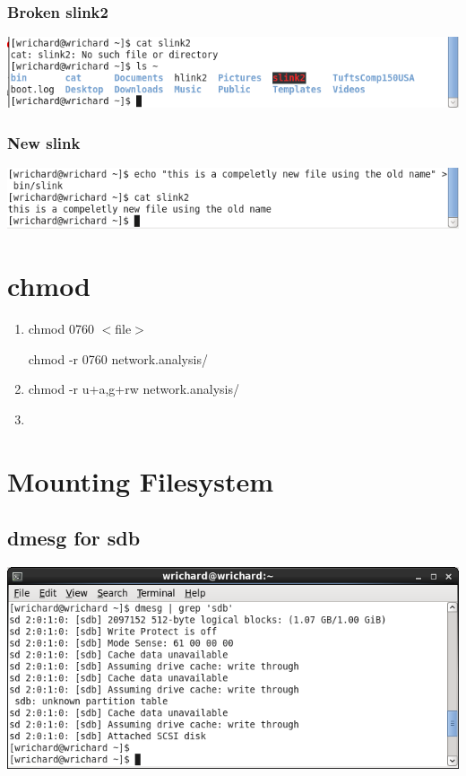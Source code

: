 \documentclass[a4paper,10pt]{article}
\begin{document}
\subsubsection{Broken slink2}
  \begin{center}
  \includegraphics[width=\linewidth]{./broken_slink2.png}
  \end{center}

\subsubsection{New slink}
  \begin{center}
  \includegraphics[width=\linewidth]{./new_slink.png}
  \end{center}

\section{chmod}
\begin{enumerate}
 \item chmod 0760 $<$file$>$

chmod -r 0760 network.analysis/
  \item chmod -r u+a,g+rw network.analysis/
  \item 
\end{enumerate}

\section{Mounting Filesystem}
\subsection{dmesg for sdb}
  \begin{center}
  \includegraphics[width=\linewidth]{./new_drive_dmesg.png}
  \end{center}
\end{document}
